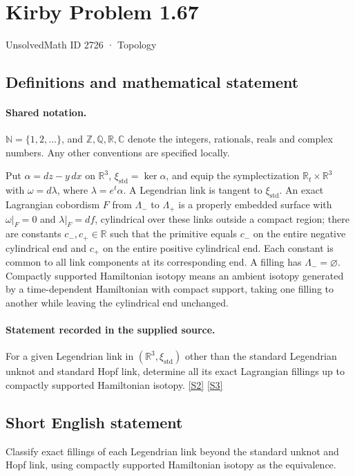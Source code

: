 \documentclass[11pt]{article}
\newcommand{\sref}[2]{\hyperlink{source:#1:#2}{[S#2]}}
\begin{document}
\setcounter{section}{2725}
\section{Kirby Problem 1.67}\label{2726}
{\small\sffamily UnsolvedMath ID 2726 · Topology}
\subsection{Definitions and mathematical statement}

\paragraph{Shared notation.}$\mathbb N=\{1,2,\ldots\}$, and $\mathbb Z,\mathbb Q,\mathbb R,\mathbb C$ denote the integers, rationals, reals and complex numbers. Any other conventions are specified locally.


Put $\alpha=dz-y\,dx$ on $\mathbb R^3$, $\xi_{\mathrm{std}}=\ker\alpha$, and equip the symplectization $\mathbb R_t\times\mathbb R^3$ with $\omega=d\lambda$, where $\lambda=e^t\alpha$. A Legendrian link is tangent to $\xi_{\mathrm{std}}$. An exact Lagrangian cobordism $F$ from $\Lambda_-$ to $\Lambda_+$ is a properly embedded surface with $\omega|_F=0$ and $\lambda|_F=df$, cylindrical over these links outside a compact region; there are constants $c_-,c_+\in\mathbb R$ such that the primitive equals $c_-$ on the entire negative cylindrical end and $c_+$ on the entire positive cylindrical end. Each constant is common to all link components at its corresponding end. A filling has $\Lambda_-=\varnothing$. Compactly supported Hamiltonian isotopy means an ambient isotopy generated by a time-dependent Hamiltonian with compact support, taking one filling to another while leaving the cylindrical end unchanged.
\paragraph{Statement recorded in the supplied source.}
For a given Legendrian link in $(\mathbb R^3,\xi_{\mathrm{std}})$ other than the standard Legendrian unknot and standard Hopf link, determine all its exact Lagrangian fillings up to compactly supported Hamiltonian isotopy. \sref{2726}{2} \sref{2726}{3}

\subsection{Short English statement}
Classify exact fillings of each Legendrian link beyond the standard unknot and Hopf link, using compactly supported Hamiltonian isotopy as the equivalence.
\end{document}
